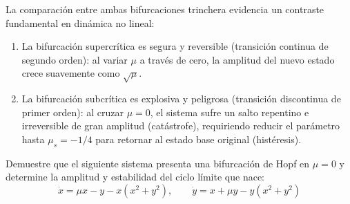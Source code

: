 \documentclass[11pt,a4paper]{article}
\newenvironment{solucion}[1][Solución Detallada]{%
    \vspace{1.5mm}%
    \noindent{\large\textbf{Solución:}}\par\vspace{1.5mm}%
}{%
    \par\vspace{3mm}%
}
\newenvironment{conclusion}[1][Interpretación Dinámica y Conclusión]{%
    \vspace{2mm}%
    \noindent{\large\textbf{Conclusión:}}\par\vspace{1.5mm}%
}{%
    \par\vspace{3mm}%
}
\begin{document}
\begin{solucion}
\begin{center}
\end{center}

\end{solucion}

\begin{conclusion}
La comparación entre ambas bifurcaciones trinchera evidencia un contraste fundamental en dinámica no lineal:
\begin{enumerate}
    \item La bifurcación supercrítica es segura y reversible (transición continua de segundo orden): al variar $\mu$ a través de cero, la amplitud del nuevo estado crece suavemente como $\sqrt{\mu}$.
    \item La bifurcación subcrítica es explosiva y peligrosa (transición discontinua de primer orden): al cruzar $\mu = 0$, el sistema sufre un salto repentino e irreversible de gran amplitud (catástrofe), requiriendo reducir el parámetro hasta $\mu_s = -1/4$ para retornar al estado base original (histéresis).
\end{enumerate}
\end{conclusion}

\vspace{3mm}

\begin{problema}[Problema 3.4]
Demuestre que el siguiente sistema presenta una bifurcación de Hopf en $\mu = 0$ y determine la amplitud y estabilidad del ciclo límite que nace:
\[
\dot{x} = \mu x - y - x(x^2 + y^2), \qquad \dot{y} = x + \mu y - y(x^2 + y^2)
\]
\end{problema}
\end{document}
